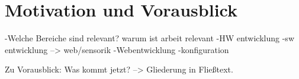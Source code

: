 \section{Motivation und Vorausblick}
-Welche Bereiche sind relevant? warum ist arbeit relevant
	-HW entwicklung
	-sw entwicklung --> web/sensorik
	-Webentwicklung
	-konfiguration
	
Zu Vorausblick: Was kommt jetzt? --> Gliederung in Fließtext.

